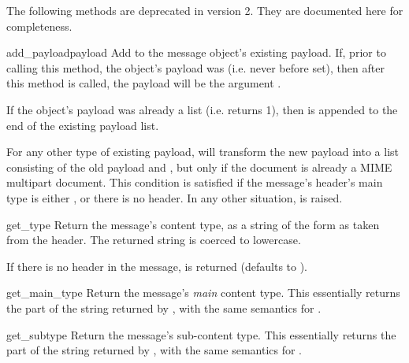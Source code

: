 The following methods are deprecated in  version 2.
They are documented here for completeness.

\begin{methoddesc}[Message]{add_payload}{payload}
Add  to the message object's existing payload.  If, prior
to calling this method, the object's payload was 
(i.e. never before set), then after this method is called, the payload
will be the argument .

If the object's payload was already a list
(i.e.  returns 1), then  is
appended to the end of the existing payload list.

For any other type of existing payload,  will
transform the new payload into a list consisting of the old payload
and , but only if the document is already a MIME
multipart document.  This condition is satisfied if the message's
 header's main type is either
, or there is no 
header.  In any other situation,
 is raised.

\end{methoddesc}

\begin{methoddesc}[Message]{get_type}{}
Return the message's content type, as a string of the form
 as taken from the
 header.
The returned string is coerced to lowercase.

If there is no  header in the message,
 is returned (defaults to ).

\end{methoddesc}

\begin{methoddesc}[Message]{get_main_type}{}
Return the message's \emph{main} content type.  This essentially returns the
 part of the string returned by , with the
same semantics for .

\end{methoddesc}

\begin{methoddesc}[Message]{get_subtype}{}
Return the message's sub-content type.  This essentially returns the
 part of the string returned by , with the
same semantics for .

\end{methoddesc}

